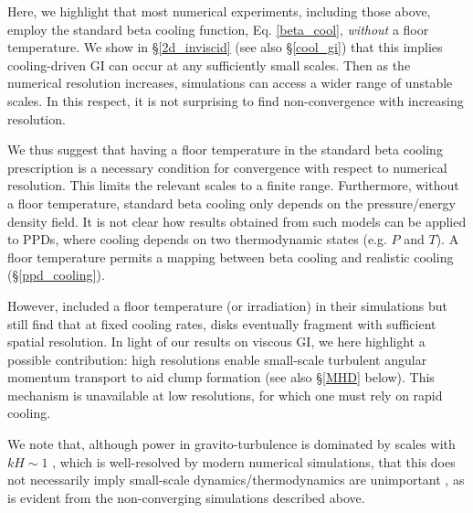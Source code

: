 Here, we highlight that most numerical experiments, including those
above, employ the standard beta cooling function, Eq. \ref{beta_cool},
\emph{without} a floor temperature. We show in \S\ref{2d_inviscid}
(see also \S\ref{cool_gi}) that this implies cooling-driven GI can
occur at any sufficiently small scales. Then as the numerical
resolution increases, simulations can access a wider range of unstable
scales.  %
In this respect, it is not surprising to find non-convergence with 
increasing resolution. %

We thus suggest that having a floor temperature in the standard beta
cooling prescription is a necessary condition for  
convergence with respect to numerical resolution. This limits the
relevant scales to a finite range.  %
Furthermore, without a floor temperature, standard beta cooling only
depends on the pressure/energy density field. It is not clear how
results obtained from such models can be applied to PPDs, where
cooling depends on two thermodynamic states (e.g. $P$ and
$T$). A floor temperature permits a mapping between beta
cooling and realistic cooling (\S\ref{ppd_cooling}). 

%


However, \cite{baehr15} included a floor temperature (or irradiation)
in their simulations but still find that at fixed cooling rates, disks
eventually fragment with sufficient spatial resolution.
In light of our results on viscous GI, 
we here highlight a possible contribution: %
high resolutions enable small-scale turbulent angular momentum transport 
to aid clump formation (see also \S\ref{MHD} below). 
This mechanism is unavailable at low resolutions, for which one must
rely on rapid cooling.  


We note that, although power in gravito-turbulence is dominated by scales with
$kH\sim 1$ \citep{cossins09}, which is  
well-resolved by modern numerical simulations, that this does not
necessarily imply small-scale dynamics/thermodynamics are unimportant
\citep[especially for non-linear evolution, see][]{young15},  
as is evident from the non-converging simulations described above.   

